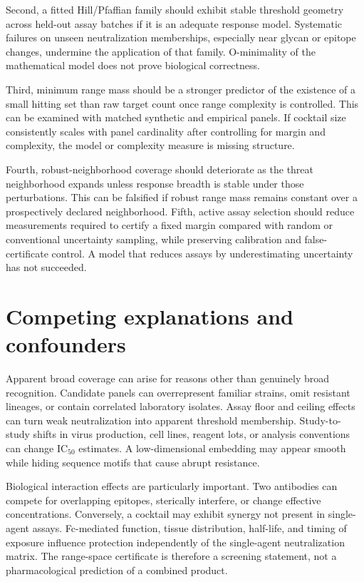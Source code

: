 \documentclass[11pt,a4paper]{article}
\begin{document}
Second, a fitted Hill/Pfaffian family should exhibit stable threshold geometry across held-out assay batches if it is an adequate response model. Systematic failures on unseen neutralization memberships, especially near glycan or epitope changes, undermine the application of that family. O-minimality of the mathematical model does not prove biological correctness.

Third, minimum range mass should be a stronger predictor of the existence of a small hitting set than raw target count once range complexity is controlled. This can be examined with matched synthetic and empirical panels. If cocktail size consistently scales with panel cardinality after controlling for margin and complexity, the model or complexity measure is missing structure.

Fourth, robust-neighborhood coverage should deteriorate as the threat neighborhood expands unless response breadth is stable under those perturbations. This can be falsified if robust range mass remains constant over a prospectively declared neighborhood. Fifth, active assay selection should reduce measurements required to certify a fixed margin compared with random or conventional uncertainty sampling, while preserving calibration and false-certificate control. A model that reduces assays by underestimating uncertainty has not succeeded.

\section{Competing explanations and confounders}
Apparent broad coverage can arise for reasons other than genuinely broad recognition. Candidate panels can overrepresent familiar strains, omit resistant lineages, or contain correlated laboratory isolates. Assay floor and ceiling effects can turn weak neutralization into apparent threshold membership. Study-to-study shifts in virus production, cell lines, reagent lots, or analysis conventions can change IC$_{50}$ estimates. A low-dimensional embedding may appear smooth while hiding sequence motifs that cause abrupt resistance.

Biological interaction effects are particularly important. Two antibodies can compete for overlapping epitopes, sterically interfere, or change effective concentrations. Conversely, a cocktail may exhibit synergy not present in single-agent assays. Fc-mediated function, tissue distribution, half-life, and timing of exposure influence protection independently of the single-agent neutralization matrix. The range-space certificate is therefore a screening statement, not a pharmacological prediction of a combined product.
\end{document}
